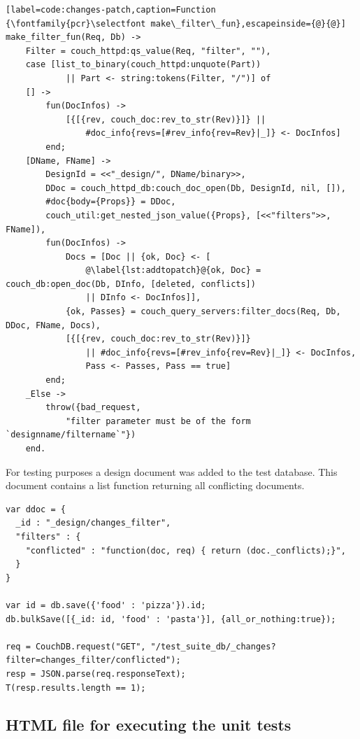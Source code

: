 \lstset{language=erlang}
\medskip
\begin{lstlisting}[label=code:changes-patch,caption=Function {\fontfamily{pcr}\selectfont make\_filter\_fun},escapeinside={@}{@}]
make_filter_fun(Req, Db) ->
    Filter = couch_httpd:qs_value(Req, "filter", ""),
    case [list_to_binary(couch_httpd:unquote(Part))
            || Part <- string:tokens(Filter, "/")] of
    [] ->
        fun(DocInfos) ->
            [{[{rev, couch_doc:rev_to_str(Rev)}]} ||
                #doc_info{revs=[#rev_info{rev=Rev}|_]} <- DocInfos]
        end;
    [DName, FName] ->
        DesignId = <<"_design/", DName/binary>>,
        DDoc = couch_httpd_db:couch_doc_open(Db, DesignId, nil, []),
        #doc{body={Props}} = DDoc,
        couch_util:get_nested_json_value({Props}, [<<"filters">>, FName]),
        fun(DocInfos) ->
            Docs = [Doc || {ok, Doc} <- [
                @\label{lst:addtopatch}@{ok, Doc} = couch_db:open_doc(Db, DInfo, [deleted, conflicts])
                || DInfo <- DocInfos]],
            {ok, Passes} = couch_query_servers:filter_docs(Req, Db, DDoc, FName, Docs),
            [{[{rev, couch_doc:rev_to_str(Rev)}]}
                || #doc_info{revs=[#rev_info{rev=Rev}|_]} <- DocInfos, 
                Pass <- Passes, Pass == true]
        end;
    _Else ->
        throw({bad_request, 
            "filter parameter must be of the form `designname/filtername`"})
    end.  
\end{lstlisting}

For testing purposes a design document was added to the test database. This document contains a list function returning all conflicting documents.

\lstset{language=javascript}
\medskip
\begin{lstlisting}[label=code:changes-patch-test,caption=Test for the function in listing \ref{code:changes-patch-test}]
var ddoc = {
  _id : "_design/changes_filter",
  "filters" : {
    "conflicted" : "function(doc, req) { return (doc._conflicts);}",
  }
}

var id = db.save({'food' : 'pizza'}).id;
db.bulkSave([{_id: id, 'food' : 'pasta'}], {all_or_nothing:true});

req = CouchDB.request("GET", "/test_suite_db/_changes?filter=changes_filter/conflicted");
resp = JSON.parse(req.responseText);
T(resp.results.length == 1);
\end{lstlisting}





\subsection{HTML file for executing the unit tests}


